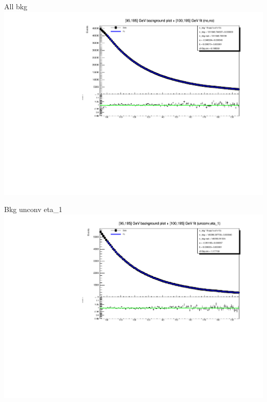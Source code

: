 \documentclass[10pt,UKenglish, leqno, xcolor = dvipsnames]{beamer}
\begin{document}
		\begin{frame}{All bkg}
			\vfill
			\centering
			\includegraphics[width=1.\textwidth]{../images/week_10/bkg_100_195GeV_fit_no_no.pdf}
			\vfill
		\end{frame}
		
		\begin{frame}{Bkg unconv eta\_1}
			\vfill
			\centering
			\includegraphics[width=1.\textwidth]{../images/week_10/bkg_100_195GeV_fit_unconv_eta_1.pdf}
			\vfill
		\end{frame}
	
\end{document}
